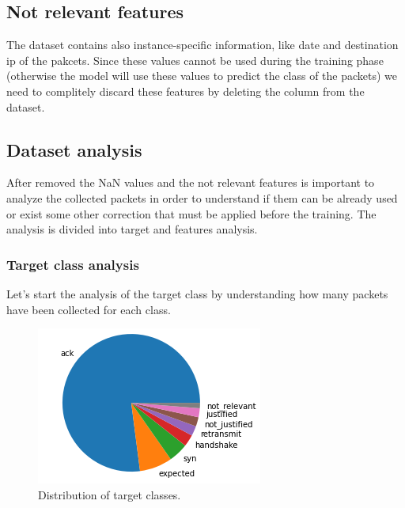 \documentclass[sigconf]{acmart}
\begin{document}
    \subsection{Not relevant features}
    The dataset contains also instance-specific information, like date and destination ip of the pakcets. Since these values cannot be used during the training phase (otherwise the model will use these values to predict the class of the packets) we need to complitely discard these features by deleting the column from the dataset.

    \subsection{Dataset analysis}
    After removed the NaN values and the not relevant features is important to analyze the collected packets in order to understand if them can be already used or exist some other correction that must be applied before the training. The analysis is divided into target and features analysis.

    \subsubsection{Target class analysis}
    Let's start the analysis of the target class by understanding how many packets have been collected for each class.
    \begin{figure}[h!]
        \includegraphics[width=0.8\linewidth]{img/target_class_distribution.png}
        \caption{Distribution of target classes.}
        \label{fig:target_class_distribution}
    \end{figure}
\end{document}
